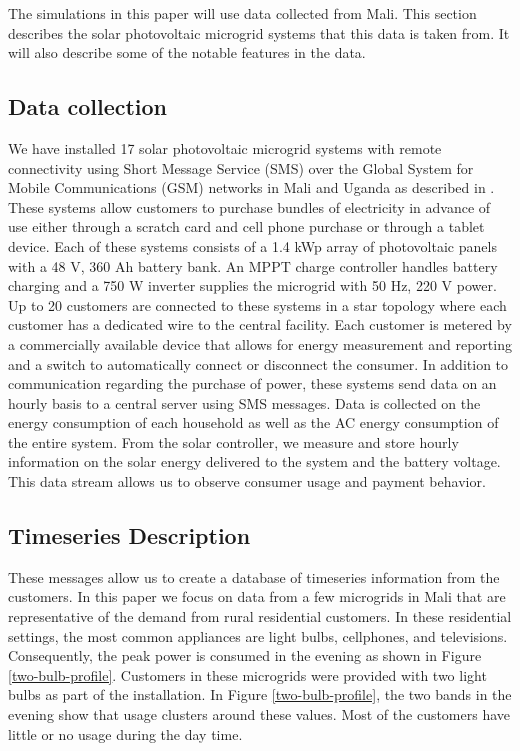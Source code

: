 \documentclass[conference]{IEEEtran}
\begin{document}
The simulations in this paper will use data collected from
Mali.
This section describes the solar photovoltaic microgrid
systems that this data is taken from.
It will also describe some of the notable features in the data.

\subsection{Data collection}
We have installed 17 solar photovoltaic microgrid systems
with remote connectivity using Short Message Service (SMS)
over the Global System for Mobile Communications (GSM) networks
in Mali and Uganda as described in \cite{ICTD}.
These systems allow customers to purchase bundles of
electricity in advance of use either through a scratch card and
cell phone purchase or through a tablet device.
Each of these systems consists of a 1.4 kWp array of photovoltaic
panels with a 48 V, 360 Ah battery bank.
An MPPT charge controller handles battery charging and a
750 W inverter supplies the microgrid with 50 Hz, 220 V power.
Up to 20 customers are connected to these systems in a star
topology where each customer has a dedicated wire to the
central facility.
Each customer is metered by a commercially available device that
allows for energy measurement and reporting and a switch to
automatically connect or disconnect the consumer.
In addition to communication regarding the purchase of power,
these systems send data on an hourly basis to a central server
using SMS messages.
Data is collected on the energy consumption of each household
as well as the AC energy consumption of the entire system.
From the solar controller, we measure and store hourly information
on the solar energy delivered to the system and the battery
voltage.
This data stream allows us to observe consumer usage and payment
behavior.

\subsection{Timeseries Description}
These messages allow us to create a database of timeseries
information from the customers.
In this paper we focus on data from a few microgrids in
Mali that are representative of the demand from rural residential
customers.
In these residential settings, the most common appliances are
light bulbs, cellphones, and televisions.
Consequently, the peak power is consumed in the evening
as shown in Figure \ref{two-bulb-profile}.
Customers in these microgrids were provided with two light bulbs
as part of the installation.
In Figure \ref{two-bulb-profile}, the two bands in the evening show
that usage clusters around these values.
Most of the customers have little or no usage during the day time.
\end{document}
